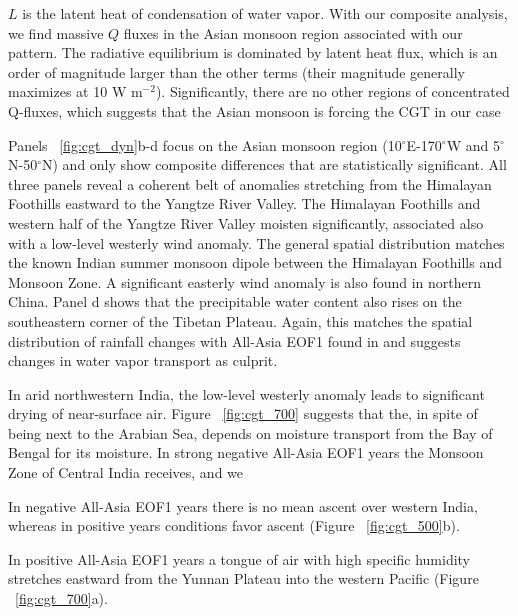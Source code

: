 	$L$ is the latent heat of condensation of water vapor. With our composite analysis, we find massive $Q$ fluxes in the Asian monsoon region associated with our pattern. The radiative equilibrium is dominated by latent heat flux, which is an order of magnitude larger than the other terms (their magnitude generally maximizes at 10 W m$^{-2}$). Significantly, there are no other regions of concentrated Q-fluxes, which suggests that the Asian monsoon is forcing the CGT in our case
	
	
	Panels ~\ref{fig:cgt_dyn}b-d focus on the Asian monsoon region (10$^{\circ}$E-170$^{\circ}$W and 5$^{\circ}$N-50$^{\circ}$N) and only show composite differences that are statistically significant. All three panels reveal a coherent belt of anomalies stretching from the Himalayan Foothills eastward to the Yangtze River Valley. The Himalayan Foothills and western half of the Yangtze River Valley moisten significantly, associated also with a low-level westerly wind anomaly. The general spatial distribution matches the known Indian summer monsoon dipole between the Himalayan Foothills and Monsoon Zone. A significant easterly wind anomaly is also found in northern China. Panel d shows that the precipitable water content also rises on the southeastern corner of the Tibetan Plateau. Again, this matches the spatial distribution of rainfall changes with All-Asia EOF1 found in \citet{Day2015} and suggests changes in water vapor transport as culprit.
	
	In arid northwestern India, the low-level westerly anomaly leads to significant drying of near-surface air. Figure ~\ref{fig:cgt_700} suggests that the, in spite of being next to the Arabian Sea, depends on moisture transport from the Bay of Bengal for its moisture. In strong negative All-Asia EOF1 years the Monsoon Zone of Central India receives, and we
	
	In negative All-Asia EOF1 years there is no mean ascent over western India, whereas in positive years conditions favor ascent (Figure  ~\ref{fig:cgt_500}b).
	
	In positive All-Asia EOF1 years a tongue of air with high specific humidity stretches eastward from the Yunnan Plateau into the western Pacific (Figure  ~\ref{fig:cgt_700}a).
	
